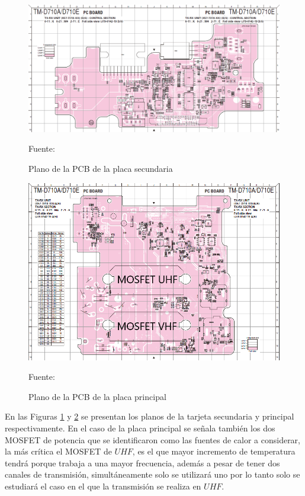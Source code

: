 \begin{figure}[H]
\centering
\includegraphics[scale=0.55]{Figuras/placasecundaria.png}
\caption{Plano de la PCB de la placa secundaria}
Fuente:\cite{manual}
\label{secundaria}
\end{figure}

\begin{figure}[H]
\centering
\includegraphics[scale=0.75]{Figuras/placaprincipal.png}
\caption{Plano de la PCB de la placa principal}
Fuente:\cite{manual}
\label{principal}
\end{figure}

En las Figuras \ref{secundaria} y \ref{principal} se presentan los planos de la tarjeta secundaria y principal respectivamente. En el caso de la placa principal se señala también los dos MOSFET de potencia que se identificaron como las fuentes de  calor a considerar, la más crítica el MOSFET de $UHF$, es el que mayor incremento de temperatura tendrá porque trabaja a una mayor frecuencia, además a pesar de tener dos canales de transmisión, simultáneamente solo se utilizará uno por lo tanto solo se estudiará el caso en el que la transmisión se realiza en $UHF$.


